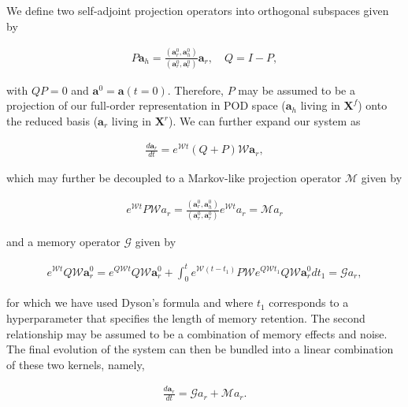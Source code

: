 \documentclass[preprint,12pt]{elsarticle}
\begin{document}
We  define two self-adjoint projection operators into orthogonal subspaces given by
\begin{linenomath*}
\begin{align}
P \textbf{a}_h = \frac{(\textbf{a}_r^0, \textbf{a}_h^0)}{(\textbf{a}_r^0,\textbf{a}_r^0)} \textbf{a}_r, \quad Q = I-P,
\end{align}
\end{linenomath*}
with $QP=0$ and $\textbf{a}^0 = \textbf{a} (t=0)$. Therefore, $P$ may be assumed to be a projection of our full-order representation in POD space ($\mathbf{a}_h$ living in $\textbf{X}^f$) onto the reduced basis ($\mathbf{a}_r$ living in $\mathbf{X}^r$). We can further expand our system as 
\begin{linenomath*}
\begin{align}
\frac{d \textbf{a}_r}{d t} = e^{\mathcal{W} t} (Q+P) \mathcal{W} \mathbf{a}_{r},
\end{align}
\end{linenomath*}
which may further be decoupled to a Markov-like projection operator $\mathcal{M}$ given by 
\begin{linenomath*}
\begin{align}
e^{\mathcal{W} t} P \mathcal{W} a_r =  \frac{(\textbf{a}_r^0, \textbf{a}_h^0)}{(\textbf{a}_r^0,\textbf{a}_r^0)} e^{\mathcal{W} t} a_r = \mathcal{M} a_r
\end{align}
\end{linenomath*}
and a memory operator $\mathcal{G}$ given by
\begin{linenomath*}
\begin{align}
e^{\mathcal{W} t} Q \mathcal{W} \mathbf{a}_r^0 = e^{Q \mathcal{W} t} Q \mathcal{W} \mathbf{a}_r^0 + \int_{0}^{t} e^{\mathcal{W}\left(t-t_{1}\right)} P \mathcal{W} e^{Q \mathcal{W} t_{1}} Q \mathcal{W} \mathbf{a}_r^0 d t_{1} = \mathcal{G} a_r,
\end{align}
\end{linenomath*}
for which we have used Dyson's formula \cite{evans2008statistical} and where $t_1$ corresponds to a hyperparameter that specifies the length of memory retention. The second relationship may be assumed to be a combination of memory effects and noise. The final evolution of the system can then be bundled into a linear combination of these two kernels, namely, 
\begin{linenomath*}
\begin{align}
\frac{d \textbf{a}_r}{d t} = \mathcal{G} a_r + \mathcal{M} a_r.
\end{align}
\end{linenomath*}
\end{document}
